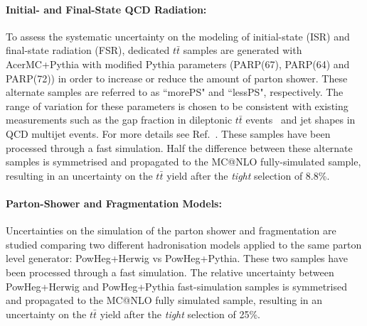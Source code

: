\paragraph{Initial- and Final-State QCD Radiation:}
To assess the systematic uncertainty on the modeling of initial-state (ISR) and final-state radiation (FSR), dedicated
$t\bar{t}$ samples are generated with {\sc AcerMC}+{\sc Pythia} with modified {\sc Pythia} parameters 
\ifIsINT
(PARP(67), PARP(64) and PARP(72)) 
\fi
in order to increase or reduce the amount of parton shower. 
\ifIsINT
These alternate samples are referred to as ``morePS" and ``lessPS", respectively.
\fi
The range of variation for these parameters is chosen to be consistent with existing measurements such as the gap fraction in dileptonic 
$t\bar{t}$ events~\cite{ttjet}  and jet shapes in QCD multijet events.
\ifIsINT
For more details see Ref.~\cite{morelessPS}.  
\fi
These samples have been processed through a fast simulation. Half the difference between these alternate samples is symmetrised 
and propagated to the {\sc MC@NLO} fully-simulated sample, resulting in an uncertainty on the $t\bar{t}$ yield after the {\sl tight} selection of 8.8\%.

\paragraph{Parton-Shower and Fragmentation Models:}
Uncertainties on the simulation of the parton shower and fragmentation are studied comparing
two different hadronisation models applied to the same parton level generator: {\sc PowHeg}+{\sc Herwig} vs {\sc PowHeg}+{\sc Pythia}. 
These two samples have been processed through a fast simulation.
The relative uncertainty between {\sc PowHeg}+{\sc Herwig} and {\sc PowHeg}+{\sc Pythia} fast-simulation samples is symmetrised and propagated to the 
{\sc MC@NLO} fully simulated sample, resulting in an uncertainty on the $t\bar{t}$ yield after the {\sl tight} selection of 25\%. 

